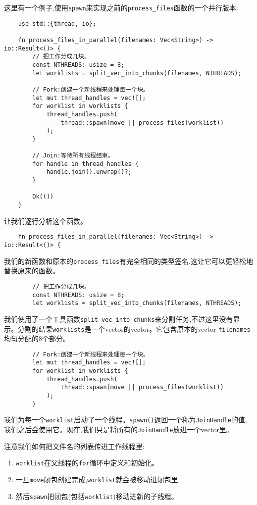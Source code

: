 这里有一个例子,使用\texttt{spawn}来实现之前的\texttt{process\_files}函数的一个并行版本:
\begin{verbatim}
    use std::{thread, io};

    fn process_files_in_parallel(filenames: Vec<String>) -> io::Result<()> {
        // 把工作分成几块。
        const NTHREADS: usize = 8;
        let worklists = split_vec_into_chunks(filenames, NTHREADS);

        // Fork:创建一个新线程来处理每一个块。
        let mut thread_handles = vec![];
        for worklist in worklists {
            thread_handles.push(
                thread::spawn(move || process_files(worklist))
            );
        }

        // Join:等待所有线程结束。
        for handle in thread_handles {
            handle.join().unwrap()?;
        }

        Ok(())
    }
\end{verbatim}

让我们逐行分析这个函数。
\begin{verbatim}
    fn process_files_in_parallel(filenames: Vec<String>) -> io::Result<()> {
\end{verbatim}

我们的新函数和原本的\texttt{process\_files}有完全相同的类型签名,这让它可以更轻松地替换原来的函数。

\begin{verbatim}
        // 把工作分成几块。
        const NTHREADS: usize = 8;
        let worklists = split_vec_into_chunks(filenames, NTHREADS);
\end{verbatim}

我们使用了一个工具函数\texttt{split\_vec\_into\_chunks}来分割任务,不过这里没有显示。分割的结果\texttt{worklists}是一个vector的vector。它包含原本的vector \texttt{filenames}均匀分配的8个部分。

\begin{verbatim}
        // Fork:创建一个新线程来处理每一个块。
        let mut thread_handles = vec![];
        for worklist in worklists {
            thread_handles.push(
                thread::spawn(move || process_files(worklist))
            );
        }
\end{verbatim}

我们为每一个\texttt{worklist}启动了一个线程。\texttt{spawn()}返回一个称为\texttt{JoinHandle}的值,我们之后会使用它。现在,我们只是将所有的\texttt{JoinHandle}放进一个vector里。

注意我们如何把文件名的列表传进工作线程里:
\begin{enumerate}
    \item \texttt{worklist}在父线程的\texttt{for}循环中定义和初始化。
    \item 一旦\texttt{move}闭包创建完成,\texttt{worklist}就会被移动进闭包里
    \item 然后\texttt{spawn}把闭包(包括\texttt{worklist})移动进新的子线程。
\end{enumerate}

